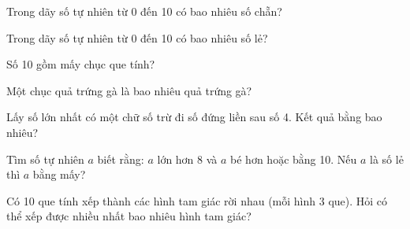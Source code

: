 \begin{ex}
Trong dãy số tự nhiên từ 0 đến 10 có bao nhiêu số chẵn?
\end{ex}

\begin{ex}
Trong dãy số tự nhiên từ 0 đến 10 có bao nhiêu số lẻ?
\end{ex}

\begin{ex}
Số 10 gồm mấy chục que tính?
\end{ex}

\begin{ex}
Một chục quả trứng gà là bao nhiêu quả trứng gà?
\end{ex}

\begin{ex}
Lấy số lớn nhất có một chữ số trừ đi số đứng liền sau số 4. Kết quả bằng bao nhiêu?
\end{ex}

\begin{ex}
Tìm số tự nhiên $a$ biết rằng: $a$ lớn hơn 8 và $a$ bé hơn hoặc bằng 10. Nếu $a$ là số lẻ thì $a$ bằng mấy?
\end{ex}

\begin{ex}
Có 10 que tính xếp thành các hình tam giác rời nhau (mỗi hình 3 que). Hỏi có thể xếp được nhiều nhất bao nhiêu hình tam giác?
\end{ex}
